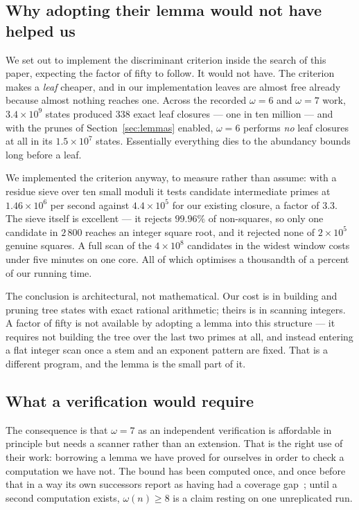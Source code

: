 \documentclass[11pt]{amsart}
\theoremstyle{remark}
\begin{document}
\subsection{Why adopting their lemma would not have helped us}
\label{sec:wronglever}
We set out to implement the discriminant criterion inside the search of this
paper, expecting the factor of fifty to follow. It would not have. The criterion
makes a \emph{leaf} cheaper, and in our implementation leaves are almost free
already because almost nothing reaches one. Across the recorded
$\omega = 6$ and $\omega = 7$ work, $3.4 \times 10^{9}$ states produced $338$
exact leaf closures --- one in ten million --- and with the prunes of
Section~\ref{sec:lemmas} enabled, $\omega = 6$ performs \emph{no} leaf closures
at all in its $1.5 \times 10^{7}$ states. Essentially everything dies to the
abundancy bounds long before a leaf.

We implemented the criterion anyway, to measure rather than assume: with a
residue sieve over ten small moduli it tests candidate intermediate primes at
$1.46 \times 10^{6}$ per second against $4.4 \times 10^{5}$ for our existing
closure, a factor of $3.3$. The sieve itself is excellent --- it rejects
$99.96\%$ of non-squares, so only one candidate in $2\,800$ reaches an integer
square root, and it rejected none of $2 \times 10^{5}$ genuine squares. A full
scan of the $4 \times 10^{8}$ candidates in the widest window costs under five
minutes on one core. All of which optimises a thousandth of a percent of our
running time.

The conclusion is architectural, not mathematical. Our cost is in building and
pruning tree states with exact rational arithmetic; theirs is in scanning
integers. A factor of fifty is not available by adopting a lemma into this
structure --- it requires not building the tree over the last two primes at all,
and instead entering a flat integer scan once a stem and an exponent pattern are
fixed. That is a different program, and the lemma is the small part of it.

\subsection{What a verification would require}
The consequence is that $\omega = 7$ as an independent
verification is affordable in principle but needs a scanner rather than an
extension. That is the
right use of their work: borrowing a lemma we have proved for ourselves in order
to check a computation we have not. The bound has been computed once, and once
before that in a way its own successors report as having had a coverage
gap~\cite{zemann}; until a second computation exists, $\omega(n) \ge 8$ is a
claim resting on one unreplicated run.
\end{document}
